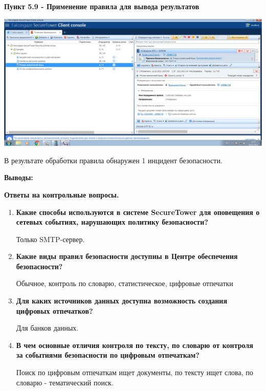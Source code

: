 \documentclass[a4paper,14pt]{extarticle}
\begin{document}
    \newpage
    \textbf{Пункт 5.9 - Применение правила для вывода результатов}
    \begin{center}
        \includegraphics[scale=0.25]{pics/5.9.jpg}

        В результате обработки правила обнаружен 1 инцидент безопасности.
    \end{center}

    \textbf{Выводы:}

    
    \textbf{Ответы на контрольные вопросы.}
    \begin{enumerate}
        \item \textbf{ Какие способы используются в системе SecureTower для оповещения о
        сетевых событиях, нарушающих политику безопасности?}

    \qquad Только SMTP-сервер. 
        \item \textbf{ Какие виды правил безопасности доступны в Центре обеспечения
        безопасности?}

    \qquad Обычное, контроль по словарю, статистическое, цифровые отпечатки
        \item \textbf{ Для каких источников данных доступна возможность создания цифровых
        отпечатков?}

    \qquad Для банков данных.
        \item \textbf{ В чем основные отличия контроля по тексту, по словарю от контроля за
        событиями безопасности по цифровым отпечаткам? }

    \qquad Поиск по цифровым отпечаткам ищет документы, по тексту ищет слова, по словарю - тематический поиск.
   \end{enumerate}
    
\end{document}
